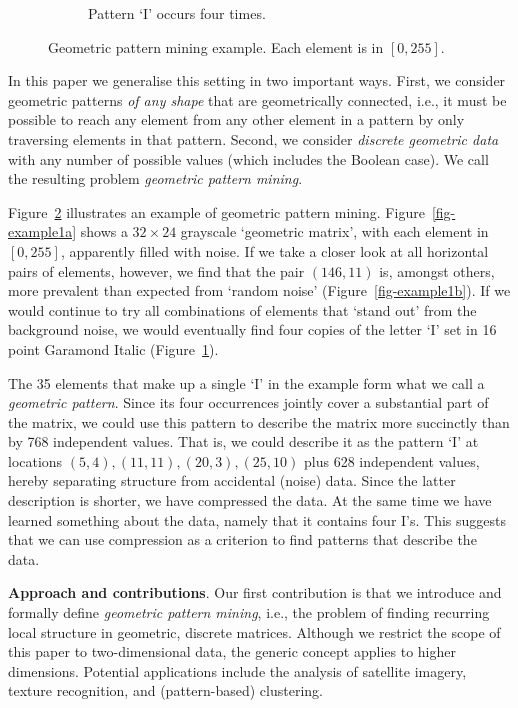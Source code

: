 \documentclass{llncs}
\begin{document}
\begin{figure}[b]
\begin{subfigure}[t]{0.37\textwidth}
\caption{Pattern `I' occurs four times.}
\label{fig-example1c}
\end{subfigure}%
\caption{Geometric pattern mining example. Each element is in $[0,255]$.}
\label{fig-example1}
\end{figure}  

In this paper we generalise this setting in two important ways. First, we consider geometric patterns \emph{of any shape} that are geometrically connected, i.e., it must be possible to reach any element from any other element in a pattern by only traversing elements in that pattern. Second, we consider \emph{discrete geometric data} with any number of possible values (which includes the Boolean case). We call the resulting problem \emph{geometric pattern mining}.

Figure~\ref{fig-example1} illustrates an example of geometric pattern mining.  Figure~\ref{fig-example1a} shows a $32 \times 24$ grayscale `geometric matrix', with each element in $[0,255]$, apparently filled with noise. If we take a closer look at all horizontal pairs of elements, however, we find that the pair $(146,11)$ is, amongst others, more prevalent than expected from `random noise' (Figure~\ref{fig-example1b}). If we would continue to try all combinations of elements that `stand out' from the background noise, we would eventually find four copies of the letter `I' set in 16 point Garamond Italic (Figure~\ref{fig-example1c}).

The 35 elements that make up a single `I' in the example form what we call a \emph{geometric pattern}. Since its four occurrences jointly cover a substantial part of the matrix, we could use this pattern to describe the matrix more succinctly than by 768 independent values. That is, we could describe it as the pattern `I' at locations $(5,4), (11,11), (20,3), (25,10)$ plus 628 independent values, hereby separating structure from accidental (noise) data. Since the latter description is shorter, we have compressed the data. At the same time we have learned something about the data, namely that it contains four I's. This suggests that we can use compression as a criterion to find patterns that describe the data.

\smallskip
\noindent \textbf{Approach and contributions}. Our first contribution is that we introduce and formally define \emph{geometric pattern mining}, i.e., the problem of finding recurring local structure in geometric, discrete matrices. Although we restrict the scope of this paper to two-dimensional data, the generic concept applies to higher dimensions. Potential applications include the analysis of satellite imagery, texture recognition, and (pattern-based) clustering.
\end{document}
